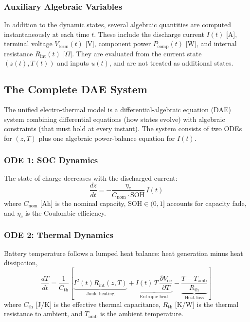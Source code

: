 \documentclass{mcmthesis}
\begin{document}
\subsubsection{Auxiliary Algebraic Variables}

In addition to the dynamic states, several algebraic quantities are computed instantaneously at each time $t$. 
These include the discharge current $I(t)$ [A], terminal voltage $V_{\text{term}}(t)$ [V], component power $P_{\text{comp}}(t)$ [W], and internal resistance $R_{\text{int}}(t)$ [$\Omega$]. 
They are evaluated from the current state $(z(t),T(t))$ and inputs $u(t)$, and are not treated as additional states.

   
\subsection{The Complete DAE System}

The unified electro-thermal model is a differential-algebraic equation (DAE) system combining differential equations (how states evolve) with algebraic constraints (that must hold at every instant). The system consists of two ODEs for $(z,T)$ plus one algebraic power-balance equation for $I(t)$.

\subsubsection{ODE 1: SOC Dynamics}

The state of charge decreases with the discharged current:
\begin{equation}
\frac{dz}{dt} = -\frac{\eta_c}{C_{\mathrm{nom}} \cdot \mathrm{SOH}} \, I(t)
\label{eq:soc_ode_unified}
\end{equation}
where $C_{\mathrm{nom}}$ [Ah] is the nominal capacity, $\mathrm{SOH}\in(0,1]$ accounts for capacity fade, and $\eta_c$ is the Coulombic efficiency.

\subsubsection{ODE 2: Thermal Dynamics}

Battery temperature follows a lumped heat balance: heat generation minus heat dissipation,
\begin{equation}
\frac{dT}{dt} = \frac{1}{C_{\mathrm{th}}}
\left[
\underbrace{I^2(t) R_{\mathrm{int}}(z,T)}_{\text{Joule heating}}
+
\underbrace{I(t)\, T \, \frac{\partial V_{\mathrm{oc}}}{\partial T}}_{\text{Entropic heat}}
-
\underbrace{\frac{T - T_{\mathrm{amb}}}{R_{\mathrm{th}}}}_{\text{Heat loss}}
\right]
\label{eq:thermal_ode_unified}
\end{equation}
where $C_{\mathrm{th}}$ [J/K] is the effective thermal capacitance, $R_{\mathrm{th}}$ [K/W] is the thermal resistance to ambient, and $T_{\mathrm{amb}}$ is the ambient temperature.
\end{document}
